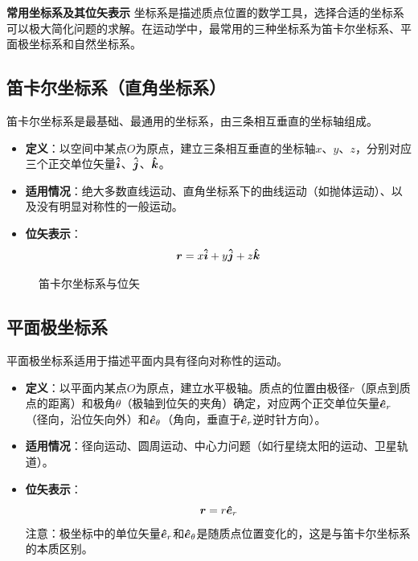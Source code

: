 \textbf{常用坐标系及其位矢表示}
坐标系是描述质点位置的数学工具，选择合适的坐标系可以极大简化问题的求解。在运动学中，最常用的三种坐标系为笛卡尔坐标系、平面极坐标系和自然坐标系。

\subsection{笛卡尔坐标系（直角坐标系）}
笛卡尔坐标系是最基础、最通用的坐标系，由三条相互垂直的坐标轴组成。
\begin{itemize}
\item \textbf{定义}：以空间中某点$O$为原点，建立三条相互垂直的坐标轴$x$、$y$、$z$，分别对应三个正交单位矢量$\boldsymbol{\hat{i}}$、$\boldsymbol{\hat{j}}$、$\boldsymbol{\hat{k}}$。
\item \textbf{适用情况}：绝大多数直线运动、直角坐标系下的曲线运动（如抛体运动）、以及没有明显对称性的一般运动。
\item \textbf{位矢表示}：
\[
\boldsymbol{r} = x\boldsymbol{\hat{i}} + y\boldsymbol{\hat{j}} + z\boldsymbol{\hat{k}}
\]
\end{itemize}

\begin{figure}[htbp]
  \centering
  \caption{笛卡尔坐标系与位矢}
\end{figure}

\subsection{平面极坐标系}
平面极坐标系适用于描述平面内具有径向对称性的运动。
\begin{itemize}
\item \textbf{定义}：以平面内某点$O$为原点，建立水平极轴。质点的位置由极径$r$（原点到质点的距离）和极角$\theta$（极轴到位矢的夹角）确定，对应两个正交单位矢量$\boldsymbol{\hat{e}}_r$（径向，沿位矢向外）和$\boldsymbol{\hat{e}}_\theta$（角向，垂直于$\boldsymbol{\hat{e}}_r$逆时针方向）。
\item \textbf{适用情况}：径向运动、圆周运动、中心力问题（如行星绕太阳的运动、卫星轨道）。
\item \textbf{位矢表示}：
\[
\boldsymbol{r} = r\boldsymbol{\hat{e}}_r
\]
注意：极坐标中的单位矢量$\boldsymbol{\hat{e}}_r$和$\boldsymbol{\hat{e}}_\theta$是随质点位置变化的，这是与笛卡尔坐标系的本质区别。
\end{itemize}

